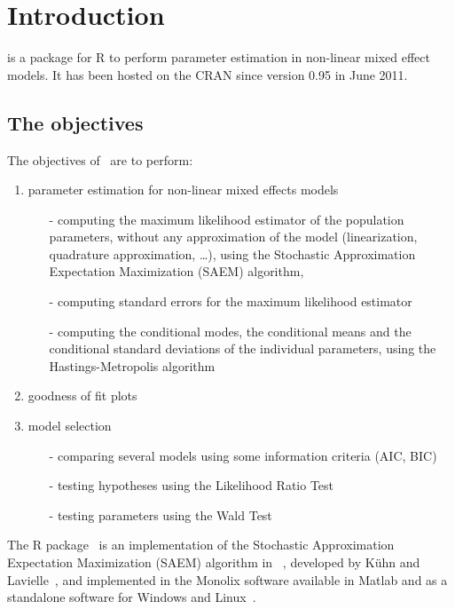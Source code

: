 \chapter{Introduction} \label{chapter_introduction}

\monolix is a package for {\sf R} to perform parameter estimation in non-linear mixed effect models. It has been hosted on the CRAN since version 0.95 in June 2011.

\section{The objectives}

The objectives of \monolix~are to perform:
\begin{enumerate}
\item parameter estimation for non-linear mixed effects models
\begin{itemize}
\item[-] computing the maximum likelihood estimator of the population parameters, without any approximation of the model (linearization, quadrature approximation, \ldots), using the Stochastic Approximation Expectation Maximization (SAEM) algorithm,
\item[-] computing standard errors for the maximum likelihood estimator
\item[-] computing the conditional modes, the conditional means and the conditional standard deviations of the individual parameters, using the Hastings-Metropolis algorithm
\end{itemize}
\item goodness of fit plots
\item model selection
\begin{itemize}
\item[-] comparing several models using some information criteria (AIC, BIC)
\item[-] testing hypotheses using the Likelihood Ratio Test
\item[-] testing parameters using the Wald Test
\end{itemize}
\end{enumerate}
The R package \monolix~is an implementation of the Stochastic Approximation Expectation Maximization (SAEM) algorithm in \R~\cite{R}, developed by K\"uhn and Lavielle~\cite{Kuhn05}, and implemented in the {\sc Monolix} software available in Matlab and as a standalone software for Windows and Linux~\cite{LavielleMonolix}.


